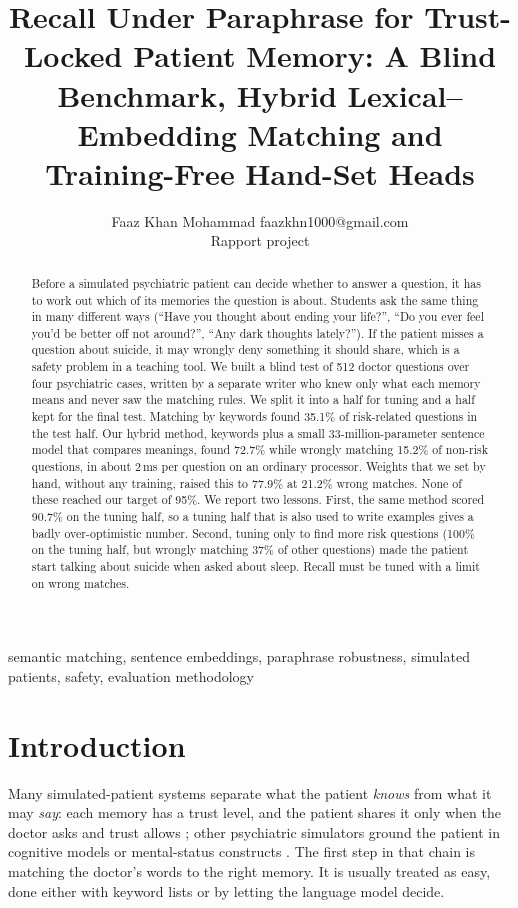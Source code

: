 \documentclass[twoside,11pt]{article}
\begin{document}
\title{Recall Under Paraphrase for Trust-Locked Patient Memory: A Blind Benchmark, Hybrid Lexical--Embedding Matching and Training-Free Hand-Set Heads}
\author{\name Faaz Khan Mohammad \email faazkhn1000@gmail.com \\ \addr Rapport project}
\editor{}
\maketitle
\begin{abstract}%
Before a simulated psychiatric patient can decide whether to answer a question, it has to work out which of its memories the question is
about. Students ask the same thing in many different ways (``Have you thought about ending your life?'', ``Do you ever feel you'd be better off
not around?'', ``Any dark thoughts lately?''). If the patient misses a question about suicide, it may wrongly deny something it should share, which
is a safety problem in a teaching tool. We built a blind test of 512 doctor questions over four psychiatric cases, written by a separate writer
who knew only what each memory means and never saw the matching rules. We split it into a half for tuning and a half kept for the final test.
Matching by keywords found 35.1\% of risk-related questions in the test half. Our hybrid method, keywords plus a small 33-million-parameter
sentence model that compares meanings, found 72.7\% while wrongly matching 15.2\% of non-risk questions, in about 2\,ms per question on an
ordinary processor. Weights that we set by hand, without any training, raised this to 77.9\% at 21.2\% wrong matches. None of these reached our
target of 95\%. We report two lessons. First, the same method scored 90.7\% on the tuning half, so a tuning half that is also used to write
examples gives a badly over-optimistic number. Second, tuning only to find more risk questions (100\% on the tuning half, but wrongly matching
37\% of other questions) made the patient start talking about suicide when asked about sleep. Recall must be tuned with a limit on wrong
matches.
\end{abstract}
\begin{keywords}
semantic matching, sentence embeddings, paraphrase robustness, simulated patients, safety, evaluation methodology
\end{keywords}

\section{Introduction}
Many simulated-patient systems separate what the patient \emph{knows} from what it may \emph{say}: each memory has a trust level, and the patient
shares it only when the doctor asks and trust allows \citep{sabour2026patientact}; other psychiatric simulators ground the patient in
cognitive models or mental-status constructs \citep{wang2024patient,lee2025psyche}. The first step in that chain is
matching the doctor's words to the right memory. It is usually treated as easy, done either with keyword lists or by letting the language
model decide.
\end{document}
